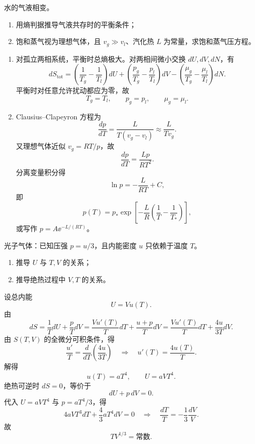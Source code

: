 \begin{question}
水的气液相变。
\begin{enumerate}[label=(\arabic*),leftmargin=2.8em,itemsep=0.2em]
\item 用熵判据推导气液共存时的平衡条件；
\item 饱和蒸气视为理想气体，且 $v_g\gg v_l$、汽化热 $L$ 为常量，求饱和蒸气压方程。
\end{enumerate}
\begin{solution}
\begin{enumerate}[label=(\arabic*),leftmargin=2.8em,itemsep=0.2em]
\item 对孤立两相系统，平衡时总熵极大。对两相间微小交换 $dU,dV,dN$，有
\[
dS_{\text{tot}}=\left(\frac1{T_g}-\frac1{T_l}\right)dU+
\left(\frac{p_g}{T_g}-\frac{p_l}{T_l}\right)dV-
\left(\frac{\mu_g}{T_g}-\frac{\mu_l}{T_l}\right)dN.
\]
平衡时对任意允许扰动都应为零，故
\[
T_g=T_l,\qquad p_g=p_l,\qquad \mu_g=\mu_l.
\]
\item Clausius--Clapeyron 方程为
\[
\frac{dp}{dT}=\frac{L}{T(v_g-v_l)}\approx \frac{L}{T v_g}.
\]
又理想气体近似 $v_g=RT/p$，故
\[
\frac{dp}{dT}=\frac{Lp}{RT^2}.
\]
分离变量积分得
\[
\ln p=-\frac{L}{RT}+C,
\]
即
\[
p(T)=p_*\exp\left[-\frac{L}{R}\left(\frac1T-\frac1{T_*}\right)\right],
\]
或写作 $p=A\ee^{-L/(RT)}$。
\end{enumerate}
\end{solution}
\end{question}

\begin{question}
光子气体：已知压强 $p=u/3$，且内能密度 $u$ 只依赖于温度 $T$。
\begin{enumerate}[label=(\arabic*),leftmargin=2.8em,itemsep=0.2em]
\item 推导 $U$ 与 $T,V$ 的关系；
\item 推导绝热过程中 $V,T$ 的关系。
\end{enumerate}
\begin{solution}
设总内能
\[
U=Vu(T).
\]
由
\[
dS=\frac{1}{T}dU+\frac{p}{T}dV
=\frac{V u'(T)}{T}dT+\frac{u+p}{T}dV
=\frac{V u'(T)}{T}dT+\frac{4u}{3T}dV.
\]
由 $S(T,V)$ 的全微分可积条件，得
\[
\frac{u'}{T}=\frac{d}{dT}\left(\frac{4u}{3T}\right)
\quad\Rightarrow\quad
u'(T)=\frac{4u(T)}{T}.
\]
解得
\[
u(T)=aT^4,
\qquad U=aVT^4.
\]
绝热可逆时 $dS=0$，等价于
\[
dU+p\,dV=0.
\]
代入 $U=aVT^4$ 与 $p=aT^4/3$，得
\[
4aVT^3dT+\frac{4}{3}aT^4dV=0
\quad\Rightarrow\quad
\frac{dT}{T}=-\frac13\frac{dV}{V}.
\]
故
\[
TV^{1/3}=\text{常数}.
\]
\end{solution}
\end{question}

